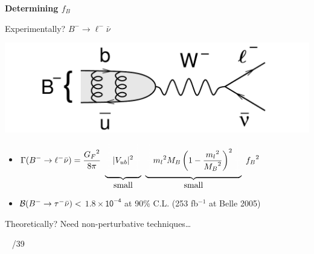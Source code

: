 \documentclass[landscape]{article}
\newenvironment{slide}[1][ ]{}{\mbox{ } \hfill \arabic{page}/39 \pagebreak}
\begin{document}
\begin{slide}
{\Huge \bf Determining $f_B$}

\vspace{0.75 cm}
\begin{minipage}{0.5\linewidth} Experimentally? $B^- \to \ell^- \bar{\nu}$ \end{minipage} \hfill \begin{minipage}{12 cm} \includegraphics[width=\linewidth]{diagram_Btolnu} \end{minipage}

\begin{itemize}\setlength{\itemsep}{1.5 cm}

\newcommand{\mathheight}{{\color{white} \frac{\frac{\frac{!}{!}}{\frac{!}{!}}}{\frac{\frac{!}{!}}{!}}}}
\item $\displaystyle \Gamma(B^- \to \ell^- \bar{\nu}) = \frac{{G_F}^2}{8\pi} \ \underbrace{\mathheight |V_{ub}|^2 \mathheight}_{\mbox{small}} \ \underbrace{\mathheight {m_l}^2 M_B \left(1 - \frac{{m_l}^2}{{M_B}^2} \right)^2 \mathheight}_{\mbox{small}} \ {f_B}^2$

\item ${\cal B}(B^- \to \tau^- \bar{\nu}) <$ $\mathsf{1.8 \times 10^{-4}}$ at 90\% C.L. (253 fb$^{-1}$ at Belle 2005)
\end{itemize}

\vfill
\begin{minipage}{0.9\linewidth} Theoretically?  Need non-perturbative techniques\ldots \end{minipage}

\vfill
\end{slide}

\end{document}
